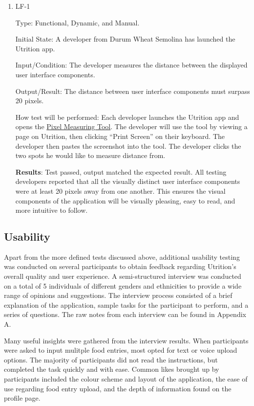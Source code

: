 \documentclass[12pt, titlepage]{article}
\begin{document}
	\begin{enumerate}
		\item{LF-1} 
		
		Type: Functional, Dynamic, and Manual.
		
		Initial State: A developer from Durum Wheat Semolina has launched the Utrition app.
		
		Input/Condition: The developer measures the distance between the displayed user interface components.
		
		Output/Result: The distance between user interface components must surpass 20 pixels.
		
		How test will be performed: Each developer launches the Utrition app and opens the \href{https://www.rapidtables.com/web/tools/pixel-ruler.html}{Pixel Measuring Tool}. The developer will use the tool by viewing a page on Utrition, then clicking “Print Screen'' on their keyboard. The developer then pastes the screenshot into the tool. The developer clicks the two spots he would like to measure distance from.
		
		\textbf{Results}: Test passed, output matched the expected result. All testing developers reported that all the visually distinct user interface components were at least 20 pixels away from one another. This ensures the visual components of the application will be visually pleasing, easy to read, and more intuitive to follow.
		
	\end{enumerate}
	
	\subsection{Usability}
	Apart from the more defined tests discussed above, additional usability testing was conducted on several participants to obtain feedback regarding Utrition's overall quality and user experience. A semi-structured interview was conducted on a total of 5 individuals of different genders and ethnicities to provide a wide range of opinions and suggestions. The interview process consisted of a brief explanation of the application, sample tasks for the participant to perform, and a series of questions. The raw notes from each interview can be found in Appendix A.
	
	Many useful insights were gathered from the interview results. When participants were asked to input mulitple food entries, most opted for text or voice upload options. The majority of participants did not read the instructions, but completed the task quickly and with ease. Common likes brought up by participants included the colour scheme and layout of the application, the ease of use regarding food entry upload, and the depth of information found on the profile page.
	
\end{document}
